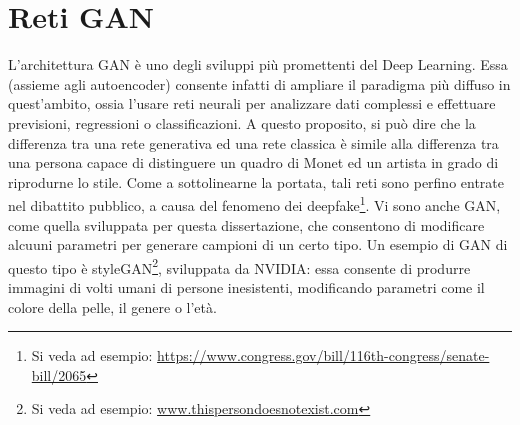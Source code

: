\documentclass[Lau, noexaminfo, oneside]{sapthesis} %
\begin{document}
\chapter{Reti GAN}
L'architettura GAN è uno degli sviluppi più promettenti del Deep Learning. Essa (assieme agli autoencoder) consente infatti di ampliare il paradigma più diffuso in quest'ambito, ossia l'usare reti neurali per analizzare dati complessi e effettuare previsioni, regressioni o classificazioni. A questo proposito, si può dire che la differenza tra una rete generativa ed una rete classica è simile alla differenza tra una persona capace di distinguere un quadro di Monet ed un artista in grado di riprodurne lo stile. Come a sottolinearne la portata, tali reti sono perfino entrate nel dibattito pubblico, a causa del fenomeno dei deepfake\footnote{Si veda ad esempio: \url{https://www.congress.gov/bill/116th-congress/senate-bill/2065}}. Vi sono anche GAN, come quella sviluppata per questa dissertazione, che consentono di modificare alcuuni parametri per generare campioni di un certo tipo. Un esempio di GAN di questo tipo è styleGAN\footnote{Si veda ad esempio: \url{www.thispersondoesnotexist.com}}, sviluppata da NVIDIA: essa consente di produrre immagini di volti umani di persone inesistenti, modificando parametri come il colore della pelle, il genere o l'età.\cite{stylegan}\\
\end{document}

